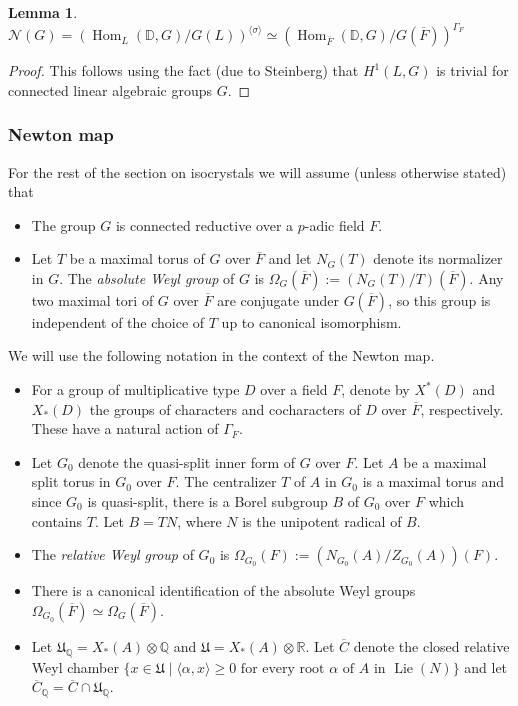 \documentclass[11pt,a4paper]{article}
\theoremstyle{definition}
\theoremstyle{plain}
\newtheorem{Le}[shared]{Lemma}
\theoremstyle{remark}
\theoremstyle{plain}
\DeclareMathOperator{\Hom}{Hom}
\DeclareMathOperator{\Lie}{Lie}
\begin{document}
\begin{Le}\label{slopesoverclosure}
    $\mathcal{N}(G) = (\Hom_L(\mathbb{D}, G)/G(L))^{\langle \sigma \rangle} \simeq (\Hom_{\overline{F}}(\mathbb{D}, G)/G(\overline{F}))^{\Gamma_F}$
\end{Le}
\begin{proof}
    This follows using the fact (due to Steinberg) that $H^1(L,G)$ is trivial for connected linear algebraic groups $G$.
\end{proof}

\subsubsection{Newton map}\label{newton}
For the rest of the section on isocrystals we will assume (unless otherwise stated) that 
\begin{itemize}
    \item The group $G$ is connected reductive over a $p$-adic field $F$.
    \item Let $T$ be a maximal torus of $G$ over $\overline{F}$ and let $N_G(T)$ denote its normalizer in $G$. The \textit{absolute Weyl group} of $G$ is $\Omega_G(\overline{F}) := (N_G(T)/T)(\overline{F})$. Any two maximal tori of $G$ over $\overline{F}$ are conjugate under $G(\overline{F})$, so this group is independent of the choice of $T$ up to canonical isomorphism.
\end{itemize}

We will use the following notation in the context of the Newton map.
\begin{itemize}
    \item For a group of multiplicative type $D$ over a field $F$, denote by $X^*(D)$ and $X_*(D)$ the groups of characters and cocharacters of $D$ over $\overline{F}$, respectively. These have a natural action of $\Gamma_F$.
    \item Let $G_0$ denote the quasi-split inner form of $G$ over $F$. Let $A$ be a maximal split torus in $G_0$ over $F$. The centralizer $T$ of $A$ in $G_0$ is a maximal torus and since $G_0$ is quasi-split, there is a Borel subgroup $B$ of $G_0$ over $F$ which contains $T$. Let $B = TN$, where $N$ is the unipotent radical of $B$.
    \item The \textit{relative Weyl group} of $G_0$ is $\Omega_{G_0}(F) := (N_{G_0}(A)/Z_{G_0}(A))(F)$.
    \item There is a canonical identification of the absolute Weyl groups $\Omega_{G_0}(\overline{F}) \simeq \Omega_G(\overline{F})$.
    \item Let $\mathfrak{U}_{\mathbb{Q}} = X_*(A) \otimes \mathbb{Q}$ and $\mathfrak{U} = X_*(A) \otimes \mathbb{R}$. Let $\overline{C}$ denote the closed relative Weyl chamber $\{ x \in \mathfrak{U} \mid \langle \alpha, x \rangle \geq 0 \text{ for every root } \alpha \text{ of } A \text{ in } \Lie(N) \}$ and let $\overline{C}_{\mathbb{Q}} = \overline{C} \cap \mathfrak{U}_{\mathbb{Q}}$.
\end{itemize}
\end{document}
